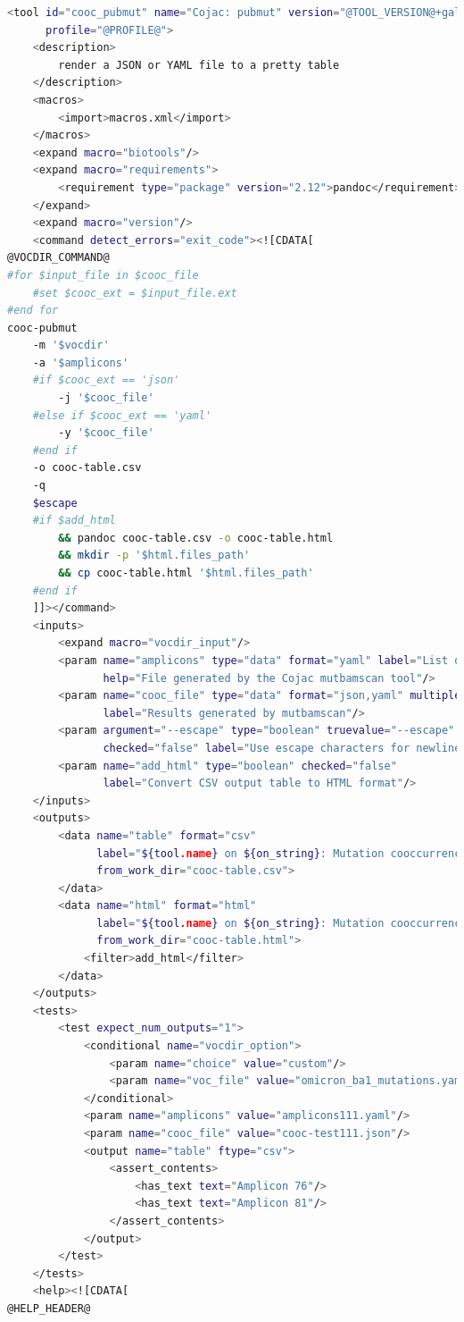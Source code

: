 \begin{lstlisting}[language=bash, caption=tool wrapper for Cojac: pubmut, label=list:methods:wrapper-cojac-pubmut]
<tool id="cooc_pubmut" name="Cojac: pubmut" version="@TOOL_VERSION@+galaxy@VERSION_SUFFIX@"
      profile="@PROFILE@">
    <description>
        render a JSON or YAML file to a pretty table
    </description>
    <macros>
        <import>macros.xml</import>
    </macros>
    <expand macro="biotools"/>
    <expand macro="requirements">
        <requirement type="package" version="2.12">pandoc</requirement>
    </expand>
    <expand macro="version"/>
    <command detect_errors="exit_code"><![CDATA[
@VOCDIR_COMMAND@
#for $input_file in $cooc_file
    #set $cooc_ext = $input_file.ext
#end for
cooc-pubmut
    -m '$vocdir'
    -a '$amplicons'
    #if $cooc_ext == 'json'
        -j '$cooc_file'
    #else if $cooc_ext == 'yaml'
        -y '$cooc_file'
    #end if
    -o cooc-table.csv
    -q
    $escape
    #if $add_html
        && pandoc cooc-table.csv -o cooc-table.html
        && mkdir -p '$html.files_path'
        && cp cooc-table.html '$html.files_path'
    #end if
    ]]></command>
    <inputs>
        <expand macro="vocdir_input"/>
        <param name="amplicons" type="data" format="yaml" label="List of query amplicons"
               help="File generated by the Cojac mutbamscan tool"/>
        <param name="cooc_file" type="data" format="json,yaml" multiple="true"
               label="Results generated by mutbamscan"/>
        <param argument="--escape" type="boolean" truevalue="--escape" falsevalue=""
               checked="false" label="Use escape characters for newlines"/>
        <param name="add_html" type="boolean" checked="false"
               label="Convert CSV output table to HTML format"/>
    </inputs>
    <outputs>
        <data name="table" format="csv"
              label="${tool.name} on ${on_string}: Mutation cooccurrence (CSV table)"
              from_work_dir="cooc-table.csv">
        </data>
        <data name="html" format="html"
              label="${tool.name} on ${on_string}: Mutation cooccurrence (HTML)"
              from_work_dir="cooc-table.html">
            <filter>add_html</filter>
        </data>
    </outputs>
    <tests>
        <test expect_num_outputs="1">
            <conditional name="vocdir_option">
                <param name="choice" value="custom"/>
                <param name="voc_file" value="omicron_ba1_mutations.yaml"/>
            </conditional>
            <param name="amplicons" value="amplicons111.yaml"/>
            <param name="cooc_file" value="cooc-test111.json"/>
            <output name="table" ftype="csv">
                <assert_contents>
                    <has_text text="Amplicon 76"/>
                    <has_text text="Amplicon 81"/>
                </assert_contents>
            </output>
        </test>
    </tests>
    <help><![CDATA[
@HELP_HEADER@


\end{lstlisting}
